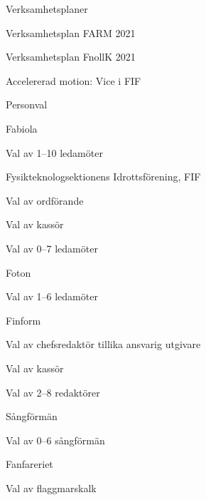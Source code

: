 \documentclass{sektionsmote}
\begin{document}
\begin{ootd}
\item{Verksamhetsplaner}
\begin{ootd}
    \item Verksamhetsplan FARM 2021
    \item Verksamhetsplan FnollK 2021
\end{ootd}


\item{Accelererad motion: Vice i FIF}

\item{Personval}
\begin{ootd}
    \item Fabiola
    \begin{ootd}
        \item Val av 1--10 ledamöter
    \end{ootd}
    \item Fysikteknologsektionens Idrottsförening, FIF
    \begin{ootd}
        \item Val av ordförande
        \item Val av kassör
        \item Val av 0--7 ledamöter
    \end{ootd}
    \item Foton
    \begin{ootd}
        \item Val av 1--6 ledamöter
    \end{ootd}
    \item Finform
    \begin{ootd}
        \item Val av chefsredaktör tillika ansvarig utgivare
        \item Val av kassör
        \item Val av 2--8 redaktörer
    \end{ootd}
    \item Sångförmän
    \begin{ootd}
        \item Val av 0--6 sångförmän
    \end{ootd}
    \item Fanfareriet
    \begin{ootd}
        \item Val av flaggmarskalk

\end{ootd}
\end{ootd}
\end{ootd}
\end{document}
